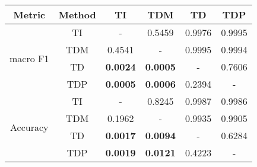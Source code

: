 \begin{tabular}{|c|c|c|c|c|c|}         
\hline
Metric &    Method                   &  TI &  TDM &  TD &  TDP \\
\hline
\multirow{4}{*}{macro F1} & TI &              - &                  0.5459 &            0.9976 &                 0.9995 \\
& TDM &              0.4541 &                  - &            0.9995 &                 0.9994 \\
& TD &              \textbf{0.0024} &                  \textbf{0.0005} &            - &                 0.7606 \\
& TDP &              \textbf{0.0005} &                  \textbf{0.0006} &            0.2394 &                 - \\
\hline
\multirow{4}{*}{Accuracy} & TI &              - &                  0.8245 &            0.9987 &                 0.9986 \\
& TDM &              0.1962 &                  - &            0.9935 &                 0.9905 \\
& TD &              \textbf{0.0017} &                  \textbf{0.0094} &            - &                 0.6284 \\
& TDP &              \textbf{0.0019} &                  \textbf{0.0121} &            0.4223 &                 - \\
\hline
\end{tabular}